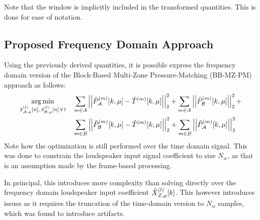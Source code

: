 Note that the window is implicitly included in the transformed quantities.
This is done for ease of notation.

\subsection{Proposed Frequency Domain Approach}
Using the previously derived quantities, it is possible express the frequency domain version of the 
Block-Based Multi-Zone Pressure-Matching (BB-MZ-PM) approach as follows:
\begin{align}
    \argmin{\tilde{x}_{\za,\mu}^{(l)}[n],\,\tilde{x}_{\zb,\mu}^{(l)}[n]\,\forall\,l}{
       &\sum_{m\in A} \norm[2][2]{\tilde{P}_{\za}^{(m)}[k,\mu] - \tilde{T}^{(m)}[k,\mu]} +
        \sum_{m\in A} \norm[2][2]{\tilde{P}_{\zb}^{(m)}[k,\mu]} + \\
       &\sum_{m\in B} \norm[2][2]{\tilde{P}_{\zb}^{(m)}[k,\mu] - \tilde{T}^{(m)}[k,\mu]} + 
        \sum_{m\in B} \norm[2][2]{\tilde{P}_{\za}^{(m)}[k,\mu]}
    }
\end{align}
Note how the optimization is still performed over the time domain signal.
This was done to constrain the loudspeaker input signal coefficient to size $N_w$, 
as that is an assumption made by the frame-based processing.

In principal, this introduces more complexity than solving directly over the frequency domain loudspeaker input coefficient
$\tilde{X}^{(l)}_{\mathcal{Z},\mu}[k]$.
This however introduces issues as it requires the truncation of the time-domain version to $N_w$ samples, which 
was found to introduce artifacts.
